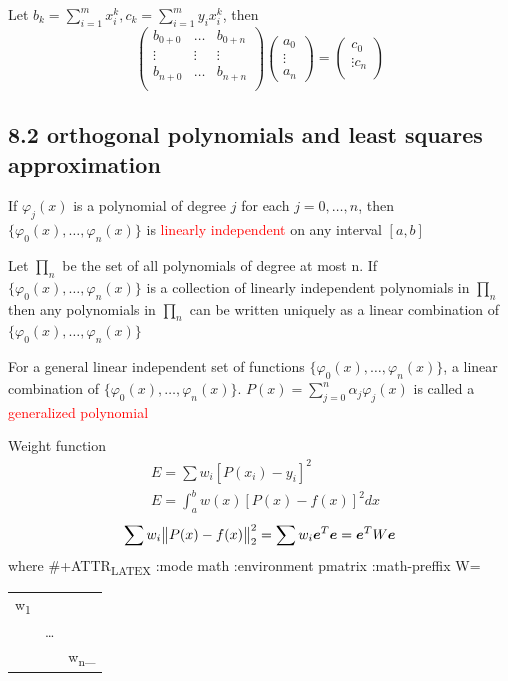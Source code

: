\documentclass[11pt]{article}
\begin{document}
Let \(b_k=\displaystyle\sum_{i=1}^m x_i^k,
   c_k=\displaystyle\sum_{i=1}^my_ix_i^k\), then
\begin{equation*}
\begin{pmatrix}
b_{0+0} & \dots & b_{0+n}\\
\vdots & \vdots&\vdots\\
b_{n+0} & \dots & b_{n+n}\\
\end{pmatrix}
\begin{pmatrix}
a_0\\
\vdots\\
a_n
\end{pmatrix}=
\begin{pmatrix}
c_0\\
\vdots
c_n\\
\end{pmatrix}
\end{equation*}
\subsection{8.2 orthogonal polynomials and least squares approximation}
\label{sec:org9c9d6c2}
\begin{theorem}
If $\varphi_j(x)$ is a polynomial of degree $j$ for each $j=0,\dots,n$, then 
$\{\varphi_0(x),\dots,\varphi_n(x)\}$ is \textcolor{red}{linearly independent} on
any interval $[a,b]$
\end{theorem}

\begin{theorem}
Let $\prod_n$ be the set of all polynomials of degree at most n. If
$\{\varphi_0(x),\dots,\varphi_n(x)\}$ is a collection of linearly independent
polynomials in $\prod_n$ then any polynomials in $\prod_n$ can be written
uniquely as a linear combination of $\{\varphi_0(x),\dots,\varphi_n(x)\}$
\end{theorem}

\begin{definition}
For a general linear independent set of functions $\{\varphi_0(x),\dots,\varphi_n(x)\}$,
a linear combination of $\{\varphi_0(x),\dots,\varphi_n(x)\}$.
$P(x)=\displaystyle\sum_{j=0}^n\alpha_j\varphi_j(x)$ is called a
\textcolor{red}{generalized polynomial} 
\end{definition}


Weight function
\begin{align*}
&E=\sum w_i[P(x_i)-y_i]^2\\
&E=\int_a^bw(x)[P(x)-f(x)]^2dx
\end{align*}
\begin{equation*}
\sum w_i\norm{P(x)-f(x)}_2^2=\sum w_i\boldsymbol{e}^T\boldsymbol{e}=\boldsymbol{e}^TW\boldsymbol{e}
\end{equation*}
where
\#+ATTR\textsubscript{LATEX} :mode math :environment pmatrix :math-preffix W=
\begin{center}
\begin{tabular}{lll}
w\textsubscript{1} &  & \\
 & \dots{} & \\
 &  & w\textsubscript{n}\_\\
\end{tabular}
\end{center}
\end{document}
